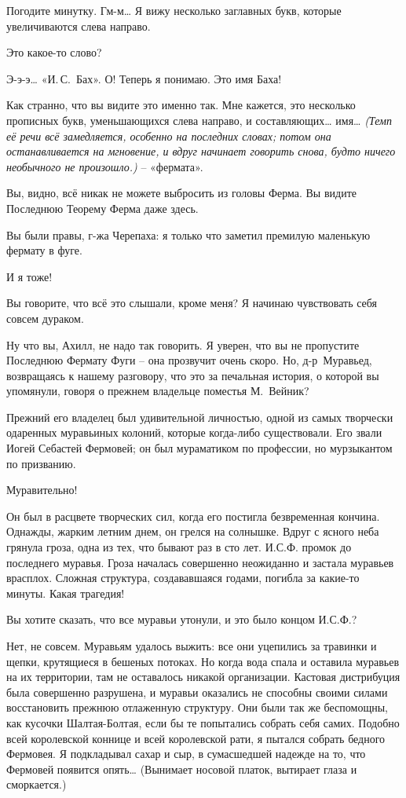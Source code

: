 \documentclass[../main.tex]{subfiles}
\begin{document}
\begin{dialogue}
 Погодите минутку. Гм-м\ldots{} Я вижу несколько заглавных букв, которые увеличиваются слева направо.

 Это какое-то слово?

 Э-э-э\ldots{} «И.\,С.~Бах». О! Теперь я понимаю. Это имя Баха!

 Как странно, что вы видите это именно так. Мне кажется, это несколько прописных букв, уменьшающихся слева направо, и составляющих\ldots{} имя\ldots{} \emph{(Темп её речи всё замедляется, особенно на последних словах; потом она останавливается на мгновение, и вдруг начинает говорить снова, будто ничего необычного не произошло.)} \--- «фермата».

 Вы, видно, всё никак не можете выбросить из головы Ферма. Вы видите Последнюю Теорему Ферма даже здесь.

 Вы были правы, г-жа Черепаха: я только что заметил премилую маленькую фермату в фуге.

 И я тоже!

 Вы говорите, что всё это слышали, кроме меня? Я начинаю чувствовать себя совсем дураком.

 Ну что вы, Ахилл, не надо так говорить. Я уверен, что вы не пропустите Последнюю Фермату Фуги \--- она прозвучит очень скоро. Но, д-р~Муравьед, возвращаясь к нашему разговору, что это за печальная история, о которой вы упомянули, говоря о прежнем владельце поместья М.~Вейник?

 Прежний его владелец был удивительной личностью, одной из самых творчески одаренных муравьиных колоний, которые когда-либо существовали. Его звали Иогей Себастей Фермовей; он был мураматиком по профессии, но мурзыкантом по призванию.

 Муравительно!

 Он был в расцвете творческих сил, когда его постигла безвременная кончина. Однажды, жарким летним днем, он грелся на солнышке. Вдруг с ясного неба грянула гроза, одна из тех, что бывают раз в сто лет. И.С.Ф. промок до последнего муравья. Гроза началась совершенно неожиданно и застала муравьев врасплох. Сложная структура, создававшаяся годами, погибла за какие-то минуты. Какая трагедия!

 Вы хотите сказать, что все муравьи утонули, и это было концом И.С.Ф.?

 Нет, не совсем. Муравьям удалось выжить: все они уцепились за травинки и щепки, крутящиеся в бешеных потоках. Но когда вода спала и оставила муравьев на их территории, там не оставалось никакой организации. Кастовая дистрибуция была совершенно разрушена, и муравьи оказались не способны своими силами восстановить прежнюю отлаженную структуру. Они были так же беспомощны, как кусочки Шалтая-Болтая, если бы те попытались собрать себя самих. Подобно всей королевской коннице и всей королевской рати, я пытался собрать бедного Фермовея. Я подкладывал сахар и сыр, в сумасшедшей надежде на то, что Фермовей появится опять\ldots{} (Вынимает носовой платок, вытирает глаза и сморкается.)


\end{dialogue}
\end{document}
